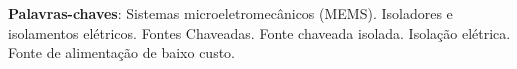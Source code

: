 




\setlength{\absparsep}{18pt} %
\begin{resumo}
	
    \lipsum[7]
    
	\vspace{\onelineskip}
 
	\noindent 
	\textbf{Palavras-chaves}: Sistemas microeletromecânicos (MEMS). Isoladores e isolamentos elétricos. Fontes Chaveadas. Fonte chaveada isolada. Isolação elétrica. Fonte de alimentação de baixo custo.
\end{resumo}

